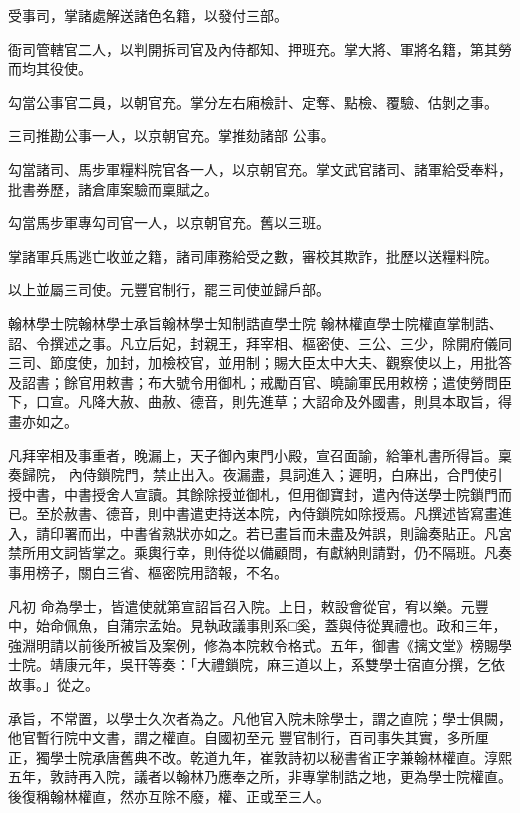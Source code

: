 \begin{pinyinscope}
 受事司，掌諸處解送諸色名籍，以發付三部。



 衙司管轄官二人，以判開拆司官及內侍都知、押班充。掌大將、軍將名籍，第其勞而均其役使。



 勾當公事官二員，以朝官充。掌分左右廂檢計、定奪、點檢、覆驗、估剝之事。



 三司推勘公事一人，以京朝官充。掌推劾諸部
 公事。



 勾當諸司、馬步軍糧料院官各一人，以京朝官充。掌文武官諸司、諸軍給受奉料，批書券歷，諸倉庫案驗而稟賦之。



 勾當馬步軍專勾司官一人，以京朝官充。舊以三班。



 掌諸軍兵馬逃亡收並之籍，諸司庫務給受之數，審校其欺詐，批歷以送糧料院。



 以上並屬三司使。元豐官制行，罷三司使並歸戶部。



 翰林學士院翰林學士承旨翰林學士知制誥直學士院
 翰林權直學士院權直掌制誥、詔、令撰述之事。凡立后妃，封親王，拜宰相、樞密使、三公、三少，除開府儀同三司、節度使，加封，加檢校官，並用制；賜大臣太中大夫、觀察使以上，用批答及詔書；餘官用敕書；布大號令用御札；戒勵百官、曉諭軍民用敕榜；遣使勞問臣下，口宣。凡降大赦、曲赦、德音，則先進草；大詔命及外國書，則具本取旨，得畫亦如之。



 凡拜宰相及事重者，晚漏上，天子御內東門小殿，宣召面諭，給筆札書所得旨。稟奏歸院，
 內侍鎖院門，禁止出入。夜漏盡，具詞進入；遲明，白麻出，合門使引授中書，中書授舍人宣讀。其餘除授並御札，但用御寶封，遣內侍送學士院鎖門而已。至於赦書、德音，則中書遣吏持送本院，內侍鎖院如除授焉。凡撰述皆寫畫進入，請印署而出，中書省熟狀亦如之。若已畫旨而未盡及舛誤，則論奏貼正。凡宮禁所用文詞皆掌之。乘輿行幸，則侍從以備顧問，有獻納則請對，仍不隔班。凡奏事用榜子，關白三省、樞密院用諮報，不名。



 凡初
 命為學士，皆遣使就第宣詔旨召入院。上日，敕設會從官，宥以樂。元豐中，始命佩魚，自蒲宗孟始。見執政議事則系□奚，蓋與侍從異禮也。政和三年，強淵明請以前後所被旨及案例，修為本院敕令格式。五年，御書《摛文堂》榜賜學士院。靖康元年，吳幵等奏：「大禮鎖院，麻三道以上，系雙學士宿直分撰，乞依故事。」從之。



 承旨，不常置，以學士久次者為之。凡他官入院未除學士，謂之直院；學士俱闕，他官暫行院中文書，謂之權直。自國初至元
 豐官制行，百司事失其實，多所厘正，獨學士院承唐舊典不改。乾道九年，崔敦詩初以秘書省正字兼翰林權直。淳熙五年，敦詩再入院，議者以翰林乃應奉之所，非專掌制誥之地，更為學士院權直。後復稱翰林權直，然亦互除不廢，權、正或至三人。




\end{pinyinscope}

